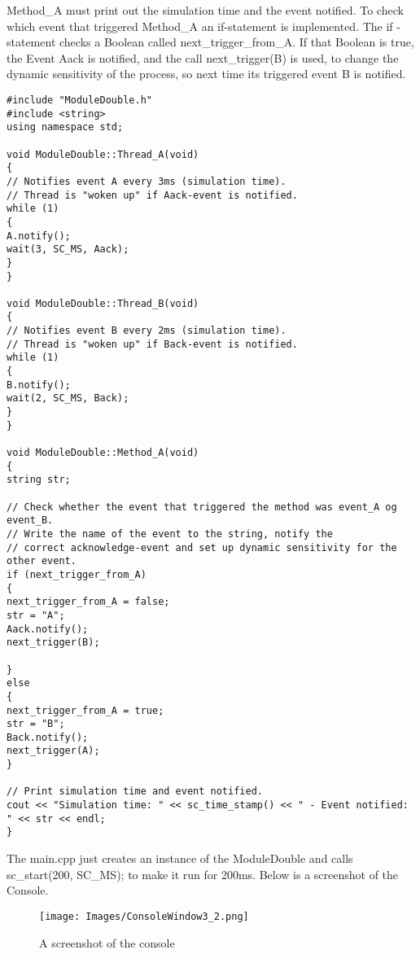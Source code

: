 Method\_A must print out the simulation time and the event notified. To check which event that triggered Method\_A an if-statement is implemented. The if -statement checks a Boolean called next\_trigger\_from\_A. If that Boolean is true, the Event Aack is notified, and the call next\_trigger(B) is used, to change the dynamic sensitivity of the process, so next time its triggered event B is notified. 

\begin{lstlisting}
#include "ModuleDouble.h"
#include <string>
using namespace std;

void ModuleDouble::Thread_A(void)
{
// Notifies event A every 3ms (simulation time).
// Thread is "woken up" if Aack-event is notified.
while (1)
{
A.notify();
wait(3, SC_MS, Aack);
}
}

void ModuleDouble::Thread_B(void)
{
// Notifies event B every 2ms (simulation time).
// Thread is "woken up" if Back-event is notified.
while (1)
{
B.notify();
wait(2, SC_MS, Back);
}
}

void ModuleDouble::Method_A(void)
{
string str;

// Check whether the event that triggered the method was event_A og event_B.
// Write the name of the event to the string, notify the 
// correct acknowledge-event and set up dynamic sensitivity for the other event.
if (next_trigger_from_A)
{
next_trigger_from_A = false;
str = "A";
Aack.notify();
next_trigger(B);

}
else
{
next_trigger_from_A = true;
str = "B";
Back.notify();
next_trigger(A);
}

// Print simulation time and event notified.
cout << "Simulation time: " << sc_time_stamp() << " - Event notified: " << str << endl;
}
\end{lstlisting}


The main.cpp just creates an instance of the ModuleDouble and calls sc\_start(200, SC\_MS); to make it run for 200ms. 
Below is a screenshot of the Console. 

\begin{figure}[H]
	\centering
	\texttt{[image: Images/ConsoleWindow3\_2.png]}
	\caption{A screenshot of the console}
	\label{fig:ConsoleWindow_3_2}
\end{figure}

